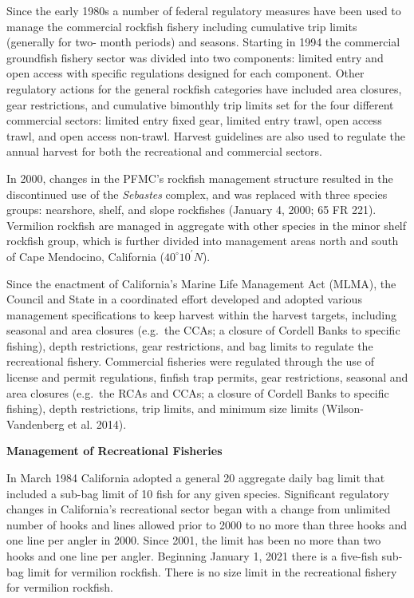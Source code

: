 \documentclass[
  english,
  a4paper,
]{article}
\begin{document}
Since the early 1980s a number of federal regulatory measures have been used to
manage the commercial rockfish fishery including cumulative trip limits (generally
for two- month periods) and seasons. Starting in 1994 the commercial groundfish
fishery sector was divided into two components: limited entry and open access
with specific regulations designed for each component. Other regulatory actions
for the general rockfish categories have included area closures, gear restrictions,
and cumulative bimonthly trip limits set for the four different commercial sectors: limited entry fixed gear, limited entry trawl, open access trawl, and open access non-trawl.
Harvest guidelines are also used to regulate the annual harvest for both the recreational and
commercial sectors.

In 2000, changes in the PFMC's rockfish management structure resulted in the discontinued
use of the \emph{Sebastes} complex, and was replaced with three species
groups: nearshore, shelf, and slope rockfishes (January 4, 2000; 65 FR 221).
Vermilion rockfish are managed in aggregate with other species in the minor shelf rockfish group, which is further divided into management areas north and south of Cape Mendocino, California ($40^\circ 10^\prime N$).

Since the enactment of California's Marine Life Management Act (MLMA), the Council and State in a coordinated
effort developed and adopted various management specifications to keep harvest
within the harvest targets, including seasonal and area closures (e.g.~the CCAs;
a closure of Cordell Banks to specific fishing), depth restrictions, gear restrictions, and bag limits to regulate the recreational fishery. Commercial fisheries were regulated through the use of license
and permit regulations, finfish trap permits, gear restrictions, seasonal
and area closures (e.g.~the RCAs and CCAs; a closure of Cordell Banks to
specific fishing), depth restrictions, trip limits, and minimum size
limits (Wilson-Vandenberg et al. 2014).

\textbf{Management of Recreational Fisheries}

In March 1984 California adopted a general 20 aggregate daily bag limit that included a sub-bag limit of 10 fish for any given species. Significant regulatory changes in California's
recreational sector began with a change
from unlimited number of hooks and lines allowed prior to 2000 to no more than
three hooks and one line per angler in 2000. Since 2001, the limit has been no more than
two hooks and one line per angler. Beginning January 1, 2021 there is a five-fish sub-bag limit for vermilion rockfish. There is no size limit in the recreational fishery
for vermilion rockfish.
\end{document}
